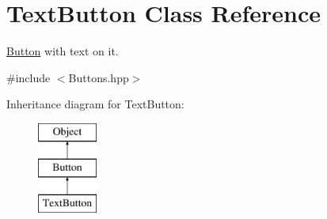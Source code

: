 \hypertarget{class_text_button}{}\section{Text\+Button Class Reference}
\label{class_text_button}


\mbox{\hyperlink{class_button}{Button}} with text on it.  




{\ttfamily \#include $<$Buttons.\+hpp$>$}

Inheritance diagram for Text\+Button\+:\begin{figure}[H]
\begin{center}
\leavevmode
\includegraphics[height=3.000000cm]{class_text_button}
\end{center}
\end{figure}

